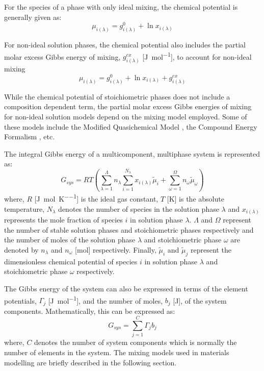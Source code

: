 	For the species of a phase with only ideal mixing, the chemical potential is generally given as:
    	\begin{equation}
        		\mu_{i(\lambda)} = g_{i(\lambda)}^0 + \ln x_{i(\lambda)}
    	\end{equation}
    	
	For non-ideal solution phases, the chemical potential also includes the partial molar excess Gibbs energy of mixing, $g_{i(\lambda)}^{ex}$ [\si{\joule \per \mole}], to account for non-ideal mixing
    	\begin{equation}
        		\mu_{i(\lambda)} = g_{i(\lambda)}^0 + \ln x_{i(\lambda)} + g_{i(\lambda)}^{ex}
    	\end{equation}
    
    	While the chemical potential of stoichiometric phases does not include a composition dependent term, the partial molar excess Gibbs energies of mixing for non-ideal solution models depend on the mixing model employed. Some of these models include the Modified Quasichemical Model \cite{Pelton00,Pelton01,Chartrand01,Pelton01b,Lambotte11}, the Compound Energy Formalism \cite{Hillert01}, etc.
	
	The integral Gibbs energy of a multicomponent, multiphase system is represented as:
    	\begin{equation}\label{eqn:integralGibbs}
        		G_{sys} = RT \left ( \sum_{\lambda=1}^{\Lambda} n_{\lambda} \sum_{i=1}^{N_{\lambda}}x_{i({\lambda})}\tilde{\mu}_i + \sum_{\omega=1}^{\Omega} n_{\omega} \tilde{\mu}_{\omega} \right )
    	\end{equation}
    	where, $R$ [\si{\joule \per \mole \per \kelvin}] is the ideal gas constant, $T$ [\si{\kelvin}] is the absolute temperature, $N_{\lambda}$ denotes the number of species in the solution phase $\lambda$ and $x_{i({\lambda})}$ represents the mole fraction of species $i$ in solution phase $\lambda$. $\Lambda$ and $\Omega$ represent the number of stable solution phases and stoichiometric phases respectively and the number of moles of the solution phase $\lambda$ and stoichiometric phase $\omega$ are denoted by $n_\lambda$ and $n_\omega$ [\si{\mole}] respectively. Finally, $\tilde{\mu}_i$ and $\tilde{\mu}_j$ represent the dimensionless chemical potential of species $i$ in solution phase $\lambda$ and stoichiometric phase $\omega$ respectively.
	
	The Gibbs energy of  the system can also be expressed in terms of the element potentials, $\Gamma_j$ [\si{\joule \per \mole}], and the number of moles, $b_j$ [\si{\joule}], of the system components. Mathematically, this can be expressed as:
	\begin{equation}\label{eq:elempot}
        		G_{sys} = \sum_{j=1}^{C} \Gamma_j b_j
    	\end{equation}
	where, $C$ denotes the number of system components which is normally the number of elements in the system. The mixing models used in materials modelling are briefly described in the following section.
	
